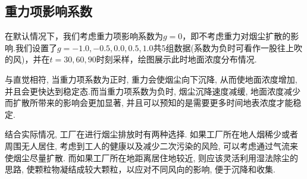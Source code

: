 \documentclass{article}
\begin{document}
	\subsection{重力项影响系数}
	在默认情况下，我们考虑重力项影响系数为$g=0$，即不考虑重力对烟尘扩散的影响.我们设置了$g=-1.0,-0.5,0.0,0.5,1.0$共5组数据(系数为负时可看作一股往上吹的风)，并在$t=30,60,90$时刻采样，绘图展示此时地面浓度分布情况.
	\par
	与直觉相符, 当重力项系数为正时, 重力会使烟尘向下沉降, 从而使地面浓度增加, 并且会更快达到稳定态.而当重力项系数为负时, 烟尘沉降速度减缓, 地面浓度减少而扩散所带来的影响会更加显著, 并且可以预知的是需要更多时间地表浓度才能稳定.
	\par
	结合实际情况, 工厂在进行烟尘排放时有两种选择. 如果工厂所在地人烟稀少或者周围无人居住, 考虑到工人的健康以及减少二次污染的风险, 可以考虑通过气流来使烟尘尽量扩散. 而如果工厂所在地距离居住地较近, 则应该灵活利用湿法除尘的思路, 使颗粒物凝结成较大颗粒，以应对不同风向的影响, 便于沉降和收集.
\end{document}
